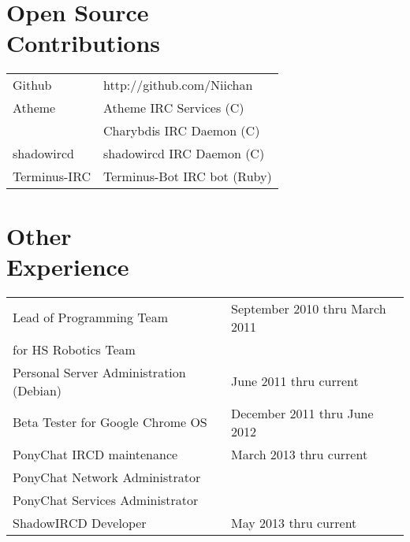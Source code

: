 \documentclass[line, margin, 10pt]{res}
\begin{document}
\begin{resume}
\section{Open Source \\ Contributions}
\begin{tabular}{l l}
Github & http://github.com/Niichan \\ [5pt]
Atheme & Atheme IRC Services (C) \\ 
& Charybdis IRC Daemon (C) \\ [5pt]
shadowircd & shadowircd IRC Daemon (C) \\ [5pt]
Terminus-IRC & Terminus-Bot IRC bot (Ruby) \\ [5pt]
\end{tabular}

\section{Other \\ Experience}
\begin{tabular}{l l}
 Lead of Programming Team & \hfill September 2010 thru March 2011 \\ 
 for HS Robotics Team & \\ [6pt]
 Personal Server Administration (Debian) & \hfill June 2011 thru current  \\ [6pt]
 Beta Tester for Google Chrome OS & \hfill December 2011 thru June 2012 \\ [6pt]
 PonyChat IRCD maintenance & \hfill March 2013 thru current \\ 
 PonyChat Network Administrator & \hfill \\ 
 PonyChat Services Administrator & \hfill \\ [6pt]
 ShadowIRCD Developer & \hfill May 2013 thru current \\
\end{tabular}
     
\end{resume}
\end{document}
